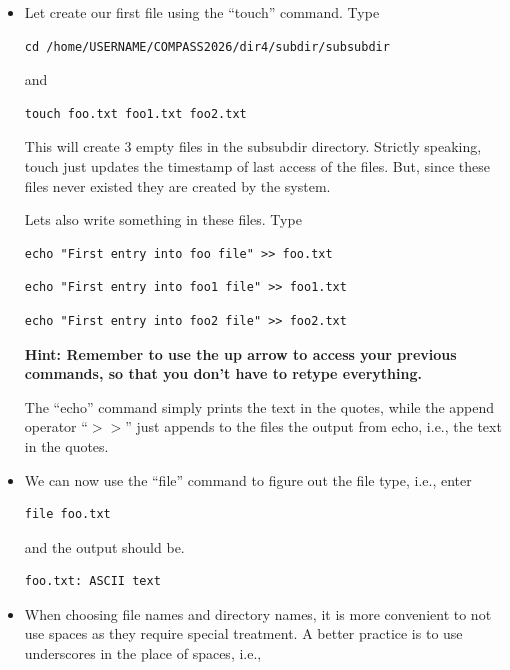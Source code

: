\documentclass[aps,showpacs,prd,notitlepage,preprintnumbers,amsmath,amssymb,letterpaper]{revtex4}
\begin{document}
\begin{itemize}
\item Let create our first file using the ``touch'' command. Type

\begin{verbatim}
cd /home/USERNAME/COMPASS2026/dir4/subdir/subsubdir
\end{verbatim}

and

\begin{verbatim}
touch foo.txt foo1.txt foo2.txt
\end{verbatim}

This will create 3 empty files in the subsubdir directory. Strictly
speaking, touch just updates the timestamp of last access of the
files.  But, since these files never existed they are created by the
system.

Lets also write something in these files. Type

\begin{verbatim}
echo "First entry into foo file" >> foo.txt
\end{verbatim}

\begin{verbatim}
echo "First entry into foo1 file" >> foo1.txt
\end{verbatim}

\begin{verbatim}
echo "First entry into foo2 file" >> foo2.txt
\end{verbatim}

{\bf Hint: Remember to use the up arrow to access your previous
commands, so that you don't have to retype everything.}

The ``echo'' command simply prints the text in the quotes, while the
append operator ``$>>$'' just appends to the files the output from
echo, i.e., the text in the quotes.

\item We can now use the ``file'' command to figure out the file type, i.e.,
enter
  
\begin{verbatim}
file foo.txt
\end{verbatim}

and the output should be.
\begin{verbatim}
foo.txt: ASCII text
\end{verbatim}

\item When choosing file names and directory names, it is more
  convenient to not use spaces as they require special treatment. A
  better practice is to use underscores in the place of spaces, i.e.,


\end{itemize}
\end{document}
